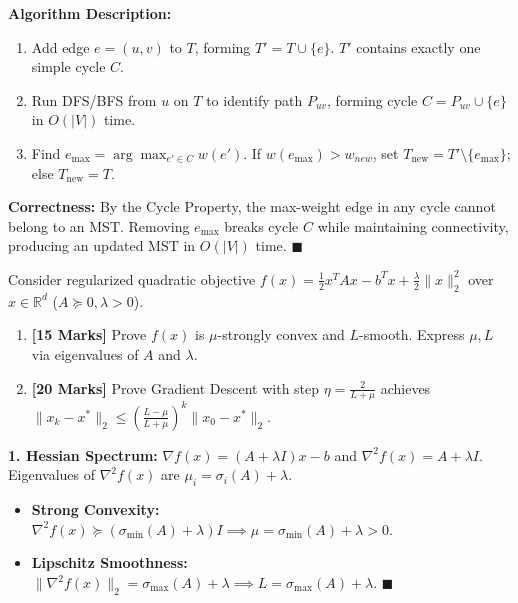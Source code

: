 \documentclass[11pt,a4paper]{article}
\newcommand{\R}{\mathbb{R}}
\begin{document}
\begin{tcolorbox}[solutionbox, title={\faCheckCircle~~Solution 1(b): Dynamic MST Edge Insertion Algorithm}]
\textbf{Algorithm Description:}
\begin{enumerate}[label=\arabic*., leftmargin=1.5em, itemsep=1pt]
    \item Add edge $e = (u, v)$ to $T$, forming $T' = T \cup \{e\}$. $T'$ contains exactly one simple cycle $C$.
    \item Run DFS/BFS from $u$ on $T$ to identify path $P_{uv}$, forming cycle $C = P_{uv} \cup \{e\}$ in $O(|V|)$ time.
    \item Find $e_{\max} = \arg\max_{e' \in C} w(e')$. If $w(e_{\max}) > w_{new}$, set $T_{\text{new}} = T' \setminus \{e_{\max}\}$; else $T_{\text{new}} = T$.
\end{enumerate}

\textbf{Correctness:} By the Cycle Property, the max-weight edge in any cycle cannot belong to an MST. Removing $e_{\max}$ breaks cycle $C$ while maintaining connectivity, producing an updated MST in $O(|V|)$ time. $\blacksquare$
\end{tcolorbox}

\vspace{2pt}

\begin{tcolorbox}[problembox, title={\faLayerGroup~~Problem 2: Convex Optimization \& Gradient Descent Convergence \hfill \normalfont\sffamily\small\textbf{[35 Marks]}}]
Consider regularized quadratic objective $f(x) = \frac{1}{2} x^T A x - b^T x + \frac{\lambda}{2} \|x\|_2^2$ over $x \in \R^d$ ($A \succeq 0, \lambda > 0$).
\begin{enumerate}[label=\alph*\lbrack\rbrack, leftmargin=1.8em, itemsep=1pt]
    \item \textbf{[15 Marks]} Prove $f(x)$ is $\mu$-strongly convex and $L$-smooth. Express $\mu, L$ via eigenvalues of $A$ and $\lambda$.
    \item \textbf{[20 Marks]} Prove Gradient Descent with step $\eta = \frac{2}{L + \mu}$ achieves $\|x_k - x^*\|_2 \le \left( \frac{L - \mu}{L + \mu} \right)^k \|x_0 - x^*\|_2$.
\end{enumerate}
\end{tcolorbox}

\vspace{2pt}

\begin{tcolorbox}[solutionbox, title={\faCheckCircle~~Solution 2(a): Smoothness and Strong Convexity Bounds}]
\textbf{1. Hessian Spectrum:} $\nabla f(x) = (A + \lambda I)x - b$ and $\nabla^2 f(x) = A + \lambda I$.
Eigenvalues of $\nabla^2 f(x)$ are $\mu_i = \sigma_i(A) + \lambda$.
\begin{itemize}[leftmargin=1.5em, itemsep=1pt]
    \item \textbf{Strong Convexity:} $\nabla^2 f(x) \succeq (\sigma_{\min}(A) + \lambda) I \implies \mu = \sigma_{\min}(A) + \lambda > 0$.
    \item \textbf{Lipschitz Smoothness:} $\|\nabla^2 f(x)\|_2 = \sigma_{\max}(A) + \lambda \implies L = \sigma_{\max}(A) + \lambda$. $\blacksquare$
\end{itemize}
\end{tcolorbox}
\end{document}
